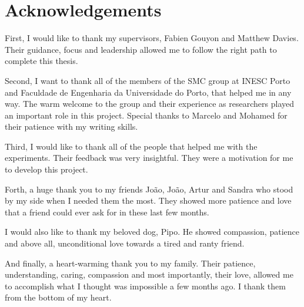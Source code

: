 
\chapter*{Acknowledgements}

First, I would like to thank my supervisors, Fabien Gouyon and Matthew Davies.
Their guidance, focus and leadership allowed me to follow the right path to complete this thesis.

Second, I want to thank all of the members of the SMC group at INESC Porto and Faculdade de Engenharia da Universidade do Porto, that helped me in any way.
The warm welcome to the group and their experience as researchers played an important role in this project.
Special thanks to Marcelo and Mohamed for their patience with my writing skills.

Third, I would like to thank all of the people that helped me with the experiments.
Their feedback was very insightful.
They were a motivation for me to develop this project.

Forth, a huge thank you to my friends João, João, Artur and Sandra who stood by my side when I needed them the most.
They showed more patience and love that a friend could ever ask for in these last few months.

I would also like to thank my beloved dog, Pipo. He showed compassion, patience and above all, unconditional love towards a tired and ranty friend.

And finally, a heart-warming thank you to my family.
Their patience, understanding, caring, compassion and most importantly, their love, allowed me to accomplish what I thought was impossible a few months ago.
I thank them from the bottom of my heart.


\vspace{10mm}
